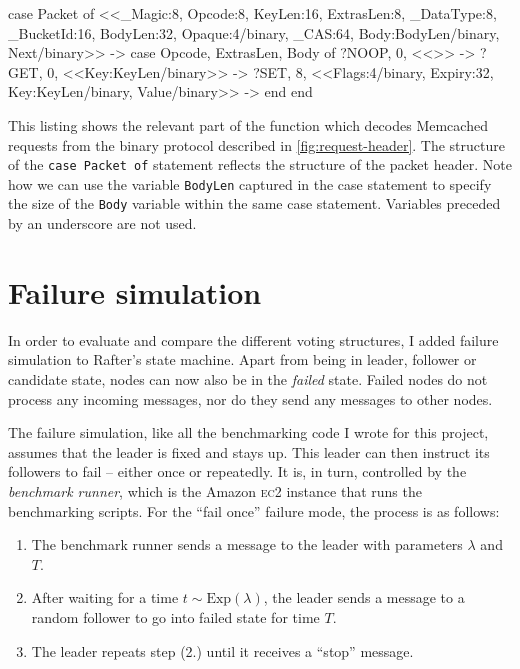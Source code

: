 \documentclass[11pt,chapterprefix=true,toc=bibliography,numbers=noendperiod,
               footnotes=multiple,twoside]{scrreprt}
\newcommand{\ECC}[0]{\textsc{ec}2 }
\begin{document}
\begin{listing}[p]
    \begin{erlangcode}
case Packet of
    <<_Magic:8,    Opcode:8,    KeyLen:16,
      ExtrasLen:8, _DataType:8, _BucketId:16,
      BodyLen:32,
      Opaque:4/binary,     %
      _CAS:64,             %
      Body:BodyLen/binary, %
      Next/binary>> ->     %
        case {Opcode, ExtrasLen, Body} of
            {?NOOP, 0, <<>>} ->
            {?GET,  0, <<Key:KeyLen/binary>>} ->
            {?SET,  8, <<Flags:4/binary, Expiry:32, Key:KeyLen/binary,
                         Value/binary>>} ->
        end
end
    \end{erlangcode}
    \caption[Request decoding in Erlang]{This listing shows the relevant part of the function which decodes Memcached requests from the binary protocol described in \cref{fig:request-header}. The structure of the \texttt{case Packet of} statement reflects the structure of the packet header. Note how we can use the variable \texttt{BodyLen} captured in the case statement to specify the size of the \texttt{Body} variable within the same case statement. Variables preceded by an underscore are not used.}
    \label{lst:request-header}
\end{listing}

\section{Failure simulation}

In order to evaluate and compare the different voting structures, I added failure simulation to Rafter's state machine. Apart from being in leader, follower or candidate state, nodes can now also be in the \textit{failed} state. Failed nodes do not process any incoming messages, nor do they send any messages to other nodes.

The failure simulation, like all the benchmarking code I wrote for this project, assumes that the leader is fixed and stays up. This leader can then instruct its followers to fail -- either once or repeatedly. It is, in turn, controlled by the \emph{benchmark runner}, which is the Amazon \ECC instance that runs the benchmarking scripts. For the \enquote{fail once} failure mode, the process is as follows:

\begin{enumerate}
    \item The benchmark runner sends a message to the leader with parameters \(\lambda\) and \(T\).
    \item After waiting for a time \(t \sim \text{Exp}(\lambda)\), the leader sends a message to a random follower to go into failed state for time \(T\).
    \item The leader repeats step (2.) until it receives a \enquote{stop} message.
\end{enumerate}
\end{document}

